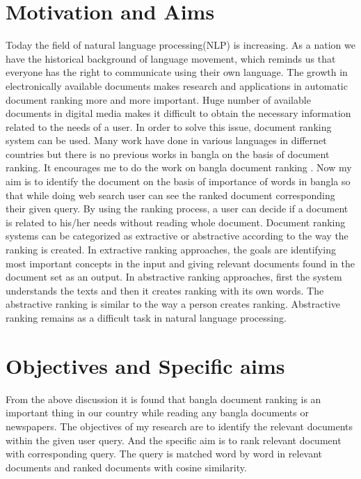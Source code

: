\section{Motivation and Aims}

Today the field of natural language processing(NLP) is increasing. As a nation we have the historical background of  language movement, which reminds us that everyone has the right to communicate using their own language. The growth in electronically available documents makes research and applications in automatic document ranking more and more important. Huge number of available documents in digital media makes it difficult to obtain the necessary information related to the needs of a user. In order to solve this issue, document ranking system can be used. Many work have done in various languages in differnet countries but there is no previous works in bangla on the basis of  document ranking. It encourages me to do the work on bangla document ranking . Now my aim is to identify the document on the basis of  importance of words in bangla so that while doing web search user can see the ranked document corresponding their  given query. By using the ranking process, a user can decide if a document is related to his/her needs without reading whole document.
Document ranking systems can be categorized as extractive or abstractive according to the way the ranking is created. In extractive ranking approaches, the goals are identifying most important concepts in the input and giving relevant documents found in the document set as an output.
In abstractive ranking approaches, first the system understands the texts and then it creates ranking with its own words. The abstractive ranking is similar to the way a person creates ranking. Abstractive ranking remains as a difficult task in natural language processing.


\section{Objectives and Specific aims}

From the above discussion it is found that bangla document ranking is an important thing in our country while reading any bangla documents or newspapers. The objectives of my research are to identify the relevant documents within the given user query.
And the specific aim is to rank relevant document with corresponding query. The query is matched word by word in relevant documents and ranked documents with cosine similarity.

